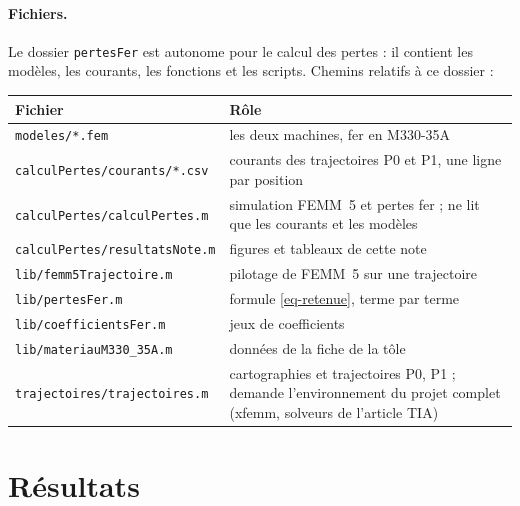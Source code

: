 \documentclass[11pt,a4paper]{article}
\begin{document}
\paragraph{Fichiers.} Le dossier \texttt{pertesFer} est autonome pour le calcul des pertes : il contient les modèles, les courants, les fonctions et les scripts. Chemins relatifs à ce dossier :
\begin{center}
\begin{tabularx}{\textwidth}{@{}lX@{}}
\toprule
Fichier & Rôle \\
\midrule
\texttt{modeles/*.fem} & les deux machines, fer en M330-35A \\
\texttt{calculPertes/courants/*.csv} & courants des trajectoires P0 et P1, une ligne par position \\
\texttt{calculPertes/calculPertes.m} & simulation FEMM~5 et pertes fer ; ne lit que les courants et les modèles \\
\texttt{calculPertes/resultatsNote.m} & figures et tableaux de cette note \\
\texttt{lib/femm5Trajectoire.m} & pilotage de FEMM~5 sur une trajectoire \\
\texttt{lib/pertesFer.m} & formule \eqref{eq-retenue}, terme par terme \\
\texttt{lib/coefficientsFer.m} & jeux de coefficients \\
\texttt{lib/materiauM330\_35A.m} & données de la fiche de la tôle \\
\texttt{trajectoires/trajectoires.m} & cartographies et trajectoires P0, P1 ; demande l'environnement du projet complet (xfemm, solveurs de l'article TIA) \\
\bottomrule
\end{tabularx}
\end{center}

\section{Résultats}\label{sec-resultats}
\end{document}
